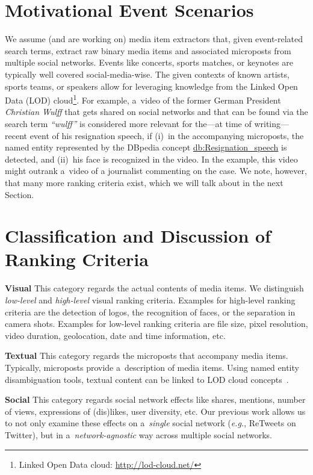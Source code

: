 \documentclass[runningheads,a4paper,11pt]{llncs}
\begin{document}
\section{Motivational Event Scenarios}
We assume (and are working on) media item extractors
that, given event-related search terms,
extract raw binary media items and associated microposts from multiple social networks.
Events like concerts, sports matches, or keynotes
are typically well covered social-media-wise.
The given contexts of known artists, sports teams, or speakers
allow for leveraging knowledge from the
Linked Open Data (LOD) cloud\footnote{Linked Open Data cloud: \url{http://lod-cloud.net/}}.
For example, a~video of the former German President \emph{Christian Wulff}
that gets shared on social networks and that can be found via the search term \emph{``wulff''}
is considered more relevant for the---at time of writing---recent
event of his resignation speech,
if (i)~in the accompanying microposts, the named entity represented by the DBpedia concept
\url{db:Resignation_speech} is detected,
and (ii)~his face is recognized in the video.
In the example, this video might outrank a~video
of a journalist commenting on the case.
We note, however, that many more ranking criteria exist,
which we will talk about in the next Section.

\section{Classification and Discussion of Ranking Criteria}
\textbf{Visual}
This category regards the actual contents of media items.
We distinguish \emph{low-level} and \emph{high-level} visual ranking criteria.
Examples for high-level ranking criteria are the detection of logos,
the recognition of faces, or the separation in camera shots.
Examples for low-level ranking criteria are file size, pixel resolution,
video duration, geolocation, date and time information, etc.

\noindent \textbf{Textual}
This category regards the microposts that accompany media items.
Typically, microposts provide a~description of media items.
Using named entity disambiguation tools,
textual content can be linked to LOD cloud concepts~\cite{Facebook2011}.

\noindent \textbf{Social}
This category regards social network effects like shares, mentions,
number of views, expressions of (dis)likes, user diversity, etc.
Our previous work allows us to not only examine these effects
on a~\emph{single} social network (\emph{e.g.}, ReTweets on Twitter),
but in a~\emph{network-agnostic} way across multiple social networks.
\end{document}
